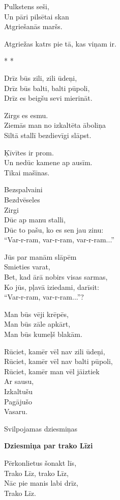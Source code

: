 \documentclass[14pt]{extarticle}
\begin{document}
Pulkstens seši,\\
Un pāri pilsētai skan\\
Atgriešanās maršs.

Atgriežas katrs pie tā, kas viņam ir.



\newpage

{\large \sc * * *}

Drīz būs zili, zili ūdeņi,\\
Drīz būs balti, balti pūpoli,\\
Drīz es beigšu sevi mierināt.

Zirgs es esmu.\\
Ziemās man no izkaltēta āboliņa\\
Siltā stallī bezdievīgi slāpst.

Ķīvītes ir prom.\\
Un nedūc kamene ap ausīm.\\
Tikai mašīnas.

Bezspalvaini\\
Bezdvēseles\\
Zirgi\\
Dūc ap manu stalli,\\
Dūc to pašu, ko es sen jau zinu:\\
``Var-r-ram, var-r-ram, var-r-ram...''

Jūs par manām slāpēm\\
Smieties varat,\\
Bet, kad ārā nobirs visas sarmas,\\
Ko jūs, pļavā iziedami, darīsit:\\
``Var-r-ram, var-r-ram...''?

Man būs vēji krēpēs,\\
Man būs zāle apkārt,\\
Man būs kumeļš blakām.

Rūciet, kamēr vēl nav zili ūdeņi,\\
Rūciet, kamēr vēl nav balti pūpoli,\\
Rūciet, kamēr man vēl jāiztiek\\
Ar sausu,\\
Izkaltušu\\
Pagājušo\\
Vasaru.



\newpage

{\large \sc Svilpojamas dziesmiņas}

{\bf Dziesmiņa par trako Līzi}

Pērkonlietus šonakt līs,\\
Trako Līz, trako Līz,\\
Nāc pie manis labi drīz,\\
Trako Līz.
\end{document}
